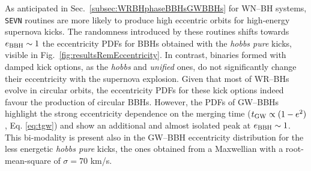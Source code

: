 \documentclass[a4paper,titlepage]{book}     	%
\begin{document}
As anticipated in Sec.\ \ref{subsec:WRBHphaseBBHsGWBBHs} for WN--BH systems, \texttt{SEVN} routines are more likely to produce high eccentric orbits for high-energy supernova kicks. The randomness introduced by these routines shifts towards $e_{\rm BBH} \sim 1$ the eccentricity PDFs for BBHs obtained with the \emph{hobbs pure} kicks, visible in Fig.\ \ref{fig:resultsRemEccentricity}. In contrast, binaries formed with damped kick options, as the \emph{hobbs} and \emph{unified} ones, do not significantly change their eccentricity with the supernova explosion. Given that most of WR--BHs evolve in circular orbits, the eccentricity PDFs for these kick options indeed favour the production of circular BBHs. However, the  PDFs of  GW--BBHs highlight the strong eccentricity dependence on the merging time ($t_{\rm GW} \propto (1-e^2)$, Eq. \ref{eq:tgw}) and show an additional and almost isolated peak at $e_{\rm BBH} \sim 1$. This bi-modality is present also in the GW--BBH eccentricity distribution for the less energetic \emph{hobbs pure} kicks, the ones obtained from a Maxwellian with a root-mean-square of $\sigma = 70$ km/s.

\clearpage
\end{document}

